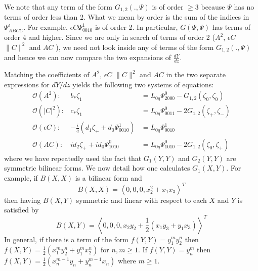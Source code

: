 We note that any term of the form $G_{1,2}\left( . , \Psi\right)$ is of order $\ge 3$ because $\Psi$ has no terms of order
less than 2. What we mean by order is the sum of the indices in $\Psi_{ABC\bar{C}}^\epsilon$. For example, $ \epsilon C \Psi_{0010}^1$ is of order 2. In particular, $G(\Psi, \Psi)$ has terms of order 4 and higher. Since we are only in search of
terms of order 2 ($A^2$, $\epsilon C$ $\|C\|^2$ and $AC$ ), we need not look inside any of terms of the form $G_{1,2}\left( . , \Psi\right)$  and hence we can now compare the two expansions of $\frac{dY}{dz}$.

Matching the coefficients of  $A^2$, $\epsilon C$ $\|C\|^2$ and
$AC$ in the two separate expressions for $dY/dz$ yields the
following two systems of equations:
\begin{subequations}
\begin{eqnarray}
\mathcal{O}(A^2): &		b_* \zeta_1 &= L_{0q} \Psi_{2000}^0 - G_{1,2}(\zeta_0,\zeta_0) \\
\mathcal{O}(\left|C\right|^2):&	c_* \zeta_1 &= L_{0q} \Psi_{0011}^0 -2 G_{1,2}(\zeta_+,\zeta_-) \label{eq:cstar} \\
\mathcal{O}(\epsilon C): &-\frac{i}{q} \left(d_1 \zeta_+ +  d_0 \Psi_{0010}^1\right) &= L_{0q} \Psi_{0010}^1 \\
\mathcal{O}(A C): 	&i d_2 \zeta_+ + i d_0 \Psi_{1010}^0 &= L_{0q} \Psi_{1010}^0 - 2 G_{1,2}(\zeta_0,\zeta_+)  \label{eq:AC}
\end{eqnarray}
\end{subequations}
where we have repeatedly used the fact that $G_1(Y,Y)$ and $G_2(Y,Y)$ are symmetric bilinear forms. 
We now detail how one calculates $G_1(X,Y)$. For example, if $B(X,X)$ is a bilinear form and 
\begin{equation*}
B(X,X)= \left<0,0,0, x_2^2 + x_1 x_3 \right>^T
\end{equation*}
then having $B(X,Y)$ symmetric and linear with respect to each $X$ and $Y$ is 
satisfied by
\begin{equation*}
B(X,Y)= \left<0,0,0, x_2 y_2 + \frac{1}{2}\left(x_1 y_3 + y_1 x_3 \right)\right>^T
\end{equation*}
In general, if there is a term of the form $f(Y,Y)=y_1^m y_2^n$ then $f(X,Y)=\frac{1}{2}\left(x_1^m y_2^n + y_1^m x_2^n\right)$
for $n,m\ge 1$. If $f(Y,Y) = y_n^m$ then $f(X,Y) = \frac{1}{2}\left( x_n^{m-1} y_n + y_n^{m-1} x_n \right) $ where $m\ge1$.

